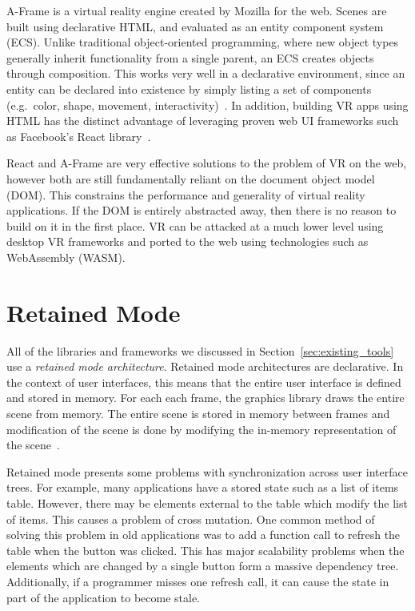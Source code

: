 \documentclass[conference,12pt]{IEEEtran}
\begin{document}
A-Frame is a virtual reality engine created by Mozilla for the web. Scenes are
built using declarative HTML, and evaluated as an entity component system (ECS).
Unlike traditional object-oriented programming, where new object types generally
inherit functionality from a single parent, an ECS creates objects through
composition. This works very well in a declarative environment, since an entity
can be declared into existence by simply listing a set of components (e.g.\
color, shape, movement,
interactivity)~\cite{Mozilla-Hacks:2016:Building-A-Frame}. In addition, building
VR apps using HTML has the distinct advantage of leveraging proven web UI
frameworks such as Facebook's React library~\cite{Ngo:2017:AFrame:React}.

React and A-Frame are very effective solutions to the problem of VR on the web,
however both are still fundamentally reliant on the document object model (DOM).
This constrains the performance and generality of virtual reality applications.
If the DOM is entirely abstracted away, then there is no reason to build on it
in the first place. VR can be attacked at a much lower level using desktop VR
frameworks and ported to the web using technologies such as WebAssembly (WASM).

\section{Retained Mode}\label{sec:retained-mode}

All of the libraries and frameworks we discussed in
Section~\ref{sec:existing_tools} use a \textit{retained mode architecture}.
Retained mode architectures are declarative. In the context of user interfaces,
this means that the entire user interface is defined and stored in memory. For
each each frame, the graphics library draws the entire scene from memory. The
entire scene is stored in memory between frames and modification of the scene is
done by modifying the in-memory representation of the
scene~\cite{Microsoft:Retained-vs-Immediate}.

Retained mode presents some problems with synchronization across user interface
trees. For example, many applications have a stored state such as a list of
items table. However, there may be elements external to the table which modify
the list of items. This causes a problem of cross mutation. One common method of
solving this problem in old applications was to add a function call to refresh
the table when the button was clicked. This has major scalability problems when
the elements which are changed by a single button form a massive dependency
tree.  Additionally, if a programmer misses one refresh call, it can cause the
state in part of the application to become stale.
\end{document}
